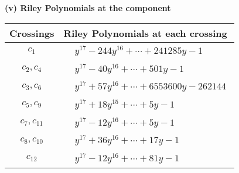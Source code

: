 \documentclass[1p]{elsarticle_modified}
\theoremstyle{definition}
\begin{document}
\flushleft \textbf{(v) Riley Polynomials at the component}\newline \\
\begin{tabular}{m{50pt}|m{274pt}}
Crossings & \hspace{64pt}Riley Polynomials at each crossing \\
\hline $$\begin{aligned}c_{1}\end{aligned}$$&$\begin{aligned}
&y^{17}-244 y^{16}+\cdots+241285 y-1
\end{aligned}$\\
\hline $$\begin{aligned}c_{2},c_{4}\end{aligned}$$&$\begin{aligned}
&y^{17}-40 y^{16}+\cdots+501 y-1
\end{aligned}$\\
\hline $$\begin{aligned}c_{3},c_{6}\end{aligned}$$&$\begin{aligned}
&y^{17}+57 y^{16}+\cdots+6553600 y-262144
\end{aligned}$\\
\hline $$\begin{aligned}c_{5},c_{9}\end{aligned}$$&$\begin{aligned}
&y^{17}+18 y^{15}+\cdots+5 y-1
\end{aligned}$\\
\hline $$\begin{aligned}c_{7},c_{11}\end{aligned}$$&$\begin{aligned}
&y^{17}-12 y^{16}+\cdots+5 y-1
\end{aligned}$\\
\hline $$\begin{aligned}c_{8},c_{10}\end{aligned}$$&$\begin{aligned}
&y^{17}+36 y^{16}+\cdots+17 y-1
\end{aligned}$\\
\hline $$\begin{aligned}c_{12}\end{aligned}$$&$\begin{aligned}
&y^{17}-12 y^{16}+\cdots+81 y-1
\end{aligned}$\\
\hline
\end{tabular}\\~\\
\end{document}
